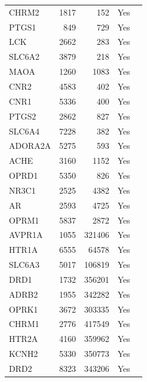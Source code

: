 \documentclass[utf8]{frontiersSCNS} %
\begin{document}
\begin{table}[]
\begin{tabular}{|l|r|r|l|l|}
    CHRM2   &       1817    &       152         &   Yes     &       \\
    PTGS1   &       849     &       729         &   Yes     &       \\
    LCK     &       2662    &       283         &   Yes     &       \\
    SLC6A2  &       3879    &       218         &   Yes     &       \\
    MAOA    &       1260    &       1083        &   Yes     &       \\
    CNR2    &       4583    &       402         &   Yes     &       \\
    CNR1    &       5336    &       400         &   Yes     &       \\
    PTGS2   &       2862    &       827         &   Yes     &       \\
    SLC6A4  &       7228    &       382         &   Yes     &       \\
    ADORA2A &       5275    &       593         &   Yes     &       \\
    ACHE    &       3160    &       1152        &   Yes     &       \\
    OPRD1   &       5350    &       826         &   Yes     &       \\
    NR3C1   &       2525    &       4382        &   Yes     &       \\
    AR      &       2593    &       4725        &   Yes     &       \\
    OPRM1   &       5837    &       2872        &   Yes     &       \\
    AVPR1A  &       1055    &       321406      &   Yes     &       \\
    HTR1A   &       6555    &       64578       &   Yes     &       \\
    SLC6A3  &       5017    &       106819      &   Yes     &       \\
    DRD1    &       1732    &       356201      &   Yes     &       \\
    ADRB2   &       1955    &       342282      &   Yes     &       \\
    OPRK1   &       3672    &       303335      &   Yes     &       \\
    CHRM1   &       2776    &       417549      &   Yes     &       \\
    HTR2A   &       4160    &       359962      &   Yes     &       \\
    KCNH2   &       5330    &       350773      &   Yes     &       \\
    DRD2    &       8323    &       343206      &   Yes     &       \\
\hline
\end{tabular}
\end{table}
\end{document}
